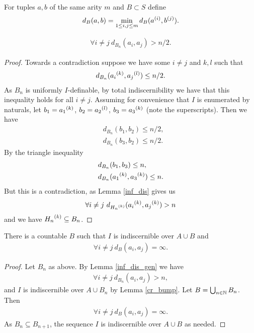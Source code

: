 \begin{Definition}
  For tuples $a,b$ of the same arity $m$ and $B \subset S$ define
  \begin{align*}
    d_B(a,b) = \min_{1 \leq i,j \leq m} d_B({a}^{(i)}, {b}^{(j)}).
  \end{align*}
\end{Definition}

\begin{Lemma} \label{inf_dis_gen}
  \begin{align*}
    \forall i \neq j \ d_{B_n}(a_i, a_j) > n/2.
  \end{align*}
\end{Lemma}

\begin{proof}
  Towards a contradiction suppose we have some $i \neq j$ and $k, l$ such that
  \begin{align*}
    d_{B_n}({a_i}^{(k)}, {a_j}^{(l)}) \leq n/2.
  \end{align*}
  As $B_n$ is uniformly $I$-definable, by total indiscernibility we have that this inequality holds for all $i \neq j$.
  Assuming for convenience that $I$ is enumerated by naturals, let $b_1 = {a_1}^{(k)}$, $b_2 = {a_2}^{(l)}$, $b_3 = {a_3}^{(k)}$
  (note the superscripts).
  Then we have
  \begin{align*}
    &d_{B_n}(b_1, b_2) \leq n/2, \\
    &d_{B_n}(b_3, b_2) \leq n/2.
  \end{align*}
  By the triangle inequality
  \begin{align*}
    &d_{B_n}(b_1, b_3) \leq n, \\
    &d_{B_n}({a_1}^{(k)}, {a_3}^{(k)}) \leq n.
  \end{align*}
  But this is a contradiction, as Lemma \ref{inf_dis} gives us
  \begin{align*}
    \forall i \neq j \ d_{{H_n}^{(k)}}({a_i}^{(k)}, {a_j}^{(k)}) > n
  \end{align*}
  and we have ${H_n}^{(k)} \subseteq B_n$.
\end{proof}

\begin{Corollary} \label{inf_dis}
  There is a countable $B$ such that $I$ is indiscernible over $A \cup B$ and
  \begin{align*}
    \forall i \neq j \ d_B(a_i, a_j) = \infty.
  \end{align*}
\end{Corollary}

\begin{proof}
  Let $B_n$ as above. By Lemma \ref{inf_dis_gen} we have 
  \begin{align*}
    \forall i \neq j \ d_{B_n}(a_i, a_j) > n,
  \end{align*}
  and $I$ is indiscernible over $A \cup B_n$ by Lemma \ref{cr_bump}.
  Let $B = \bigcup_{n \in \mathbb{N}} B_n$.
  Then
  \begin{align*}
    \forall i \neq j \ d_{B}(a_i, a_j) = \infty.
  \end{align*}
  As $B_n \subseteq B_{n+1}$, the sequence $I$ is indiscernible over $A \cup B$ as needed.
\end{proof}

